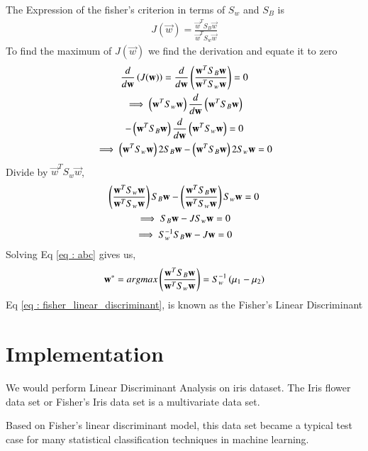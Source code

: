 \documentclass[journal,12pt,twocolumn]{IEEEtran}
\begin{document}
The Expression of the fisher's criterion in terms of $S_{w}$ and $S_{B}$ is
\begin{align}
     J(\vec{w}) = \frac{\vec{w}^{T}S_{B}\vec{w}}{\vec{w}^{T}S_{w}\vec{w}}
\end{align}
To find the maximum of $J(\vec{w})$ we find the derivation and equate it to zero
\begin{multline}
    \frac{d}{d\mathbf{w}}\left(J(\mathbf{w})\right) = \frac{d}{d\mathbf{w}}\left(\frac{\mathbf{w}^{T}S_{B}\mathbf{w}}{\mathbf{w}^{T}S_{w}\mathbf{w}}\right) = 0\\
\implies \left(\mathbf{w}^{T}S_{w}\mathbf{w}\right)\frac{d}{d\mathbf{w}}\left(\mathbf{w}^{T}S_{B}\mathbf{w}\right)\\ 
-\left(\mathbf{w}^{T}S_{B}\mathbf{w}\right)\frac{d}{d\mathbf{w}}\left(\mathbf{w}^{T}S_{w}\mathbf{w}\right) = 0\\
 \implies \left(\mathbf{w}^{T}S_{w}\mathbf{w}\right)2S_{B}\mathbf{w} - \left(\mathbf{w}^{T}S_{B}\mathbf{w}\right)2S_{w}\mathbf{w} = 0
\end{multline}
Divide by $\vec{w}^{T}S_{w}\vec{w}$,
\begin{multline}
    \left(\frac{\mathbf{w}^{T}S_{w}\mathbf{w}}{\mathbf{w}^{T}S_{w}\mathbf{w}}\right)S_{B}\mathbf{w} - \left(\frac{\mathbf{w}^{T}S_{B}\mathbf{w}}{\mathbf{w}^{T}S_{w}\mathbf{w}}\right)S_{w}\mathbf{w} = 0\\
    \implies S_{B}\mathbf{w} - JS_{w}\mathbf{w} = 0\\
    \implies S_{w}^{-1}S_{B}\mathbf{w} - J\mathbf{w} = 0 \label{eq : abc}
\end{multline}
Solving Eq \eqref{eq : abc} gives us, 
\begin{align}
    \mathbf{w}^{*} = argmax\left(\frac{\mathbf{w}^{T}S_{B}\mathbf{w}}{\mathbf{w}^{T}S_{w}\mathbf{w}}\right) = S_{w}^{-1}\left(\mu_{1} - \mu_{2}\right) \label{eq : fisher_linear_discriminant}
\end{align}
Eq \eqref{eq : fisher_linear_discriminant}, is known as the Fisher's Linear Discriminant
\section{Implementation}
We would perform Linear Discriminant Analysis on iris dataset. The Iris flower data set or Fisher's Iris data set is a multivariate data set. 

Based on Fisher's linear discriminant model, this data set became a typical test case for many statistical classification techniques in machine learning.
\end{document}
